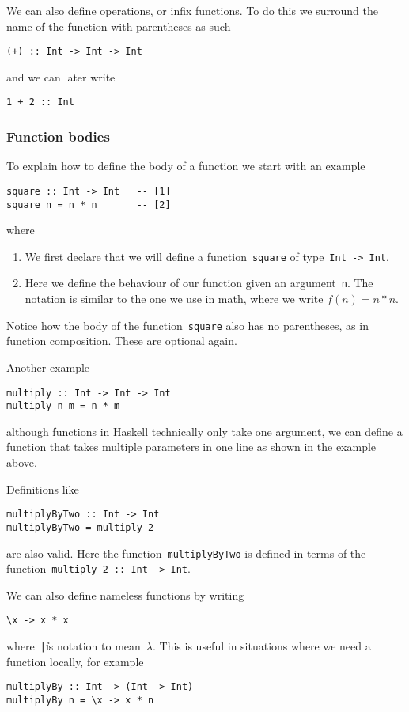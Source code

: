 \documentclass[../TFG.tex]{subfiles}
\begin{document}
We can also define operations, or infix functions. To do this we surround the
name of the function with parentheses as such
\begin{verbatim}
(+) :: Int -> Int -> Int
\end{verbatim}
and we can later write
\begin{verbatim}
1 + 2 :: Int
\end{verbatim}

\subsubsection{Function bodies}
To explain how to define the body of a function we start with an example
\begin{verbatim}
square :: Int -> Int   -- [1]
square n = n * n       -- [2]
\end{verbatim}
where
\begin{enumerate}
    \item We first declare that we will define a
        function~\texttt{square} of
        type~\texttt{Int -> Int}.
    \item Here we define the behaviour of our function given an
        argument~\texttt{n}. The notation is similar to the one
        we use in math, where we write \(f(n) = n*n\).
\end{enumerate}
Notice how the body of the function~\texttt{square} also has no
parentheses, as in function composition. These are optional again.

Another example
\begin{verbatim}
multiply :: Int -> Int -> Int
multiply n m = n * m
\end{verbatim}
although functions in Haskell technically only take one argument, we can define
a function that takes multiple parameters in one line as shown in the example
above.

Definitions like
\begin{verbatim}
multiplyByTwo :: Int -> Int
multiplyByTwo = multiply 2
\end{verbatim}
are also valid. Here the function~\texttt{multiplyByTwo} is defined
in terms of the function~\texttt{multiply 2 :: Int -> Int}.

We can also define nameless functions by writing
\begin{verbatim}
\x -> x * x
\end{verbatim}
where~\texttt|\| is notation to mean~\(\lambda\). This is useful
in situations where we need a function locally, for example
\begin{verbatim}
multiplyBy :: Int -> (Int -> Int)
multiplyBy n = \x -> x * n
\end{verbatim}
\end{document}

